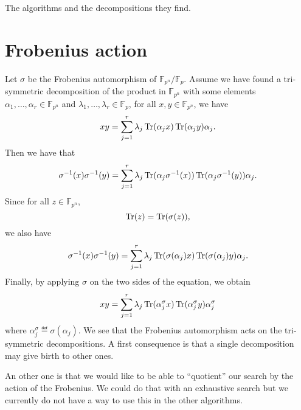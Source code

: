 \documentclass[a4paper,11pt]{article}
\begin{document}
\begin{ex}
\begin{table}
   \caption{The algorithms and the decompositions they find.}
   \label{tab:algos}
 \end{table}

\end{ex}

\section{Frobenius action}

Let $\sigma$ be the Frobenius automorphism of $\mathbb{F}_{p^n}/\mathbb{F}_p$.
Assume we have found a tri-symmetric decomposition of the product in
$\mathbb{F}_{p^n}$ with some elements $\alpha_1, \dots, \alpha_r\in
\mathbb{F}_{p^n}$ and
$\lambda_1, \dots, \lambda_r\in\mathbb{F}_p$, \ie for all
$x, y\in\mathbb{F}_{p^n}$, we have
\[
  xy = \sum_{j=1}^r \lambda_j \operatorname{Tr}(\alpha_jx)\operatorname{Tr}(\alpha_jy)\alpha_j.
\]
Then we have that
\[
  \sigma^{-1}(x)\sigma^{-1}(y) = \sum_{j=1}^r \lambda_j
  \operatorname{Tr}(\alpha_j\sigma^{-1}(x))\operatorname{Tr}(\alpha_j\sigma^{-1}(y))\alpha_j.
\]
Since for all $z\in\mathbb{F}_{p^n}$,
\[
  \operatorname{Tr}(z) = \operatorname{Tr}(\sigma(z)),
\]
we also have
\[
  \sigma^{-1}(x)\sigma^{-1}(y) = \sum_{j=1}^r \lambda_j
  \operatorname{Tr}(\sigma(\alpha_j)x)\operatorname{Tr}(\sigma(\alpha_j)y)\alpha_j.
\]
Finally, by applying $\sigma$ on the two sides of the equation, we obtain
\[
  xy = \sum_{j=1}^r \lambda_j \operatorname{Tr}(\alpha_j^\sigma x)\operatorname{Tr}(\alpha_j^\sigma y)\alpha_j^\sigma
\]
where $\alpha_j^\sigma \eqdef \sigma(\alpha_j)$. We see that the Frobenius
automorphism acts on the tri-symmetric decompositions. A first consequence is
that a single decomposition may give birth to other ones.

An other one is that we would like to be able to ``quotient'' our search by the
action of the Frobenius. We could do that with an exhaustive search but we
currently do not have a way to use this in the other algorithms. 



\end{document}
